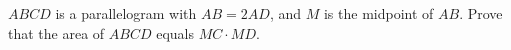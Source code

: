 $ABCD$ is a parallelogram with $AB=2AD$, and $M$ is the midpoint of $AB$. Prove that the area of $ABCD$ equals $MC\cdot MD$.

